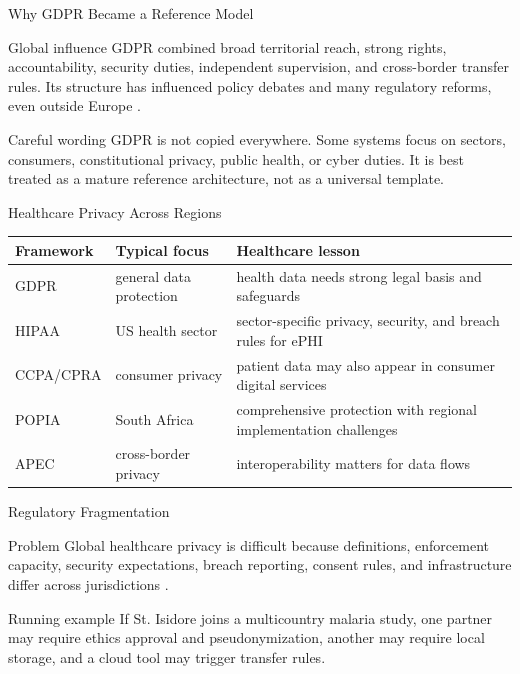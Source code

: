 \documentclass[presentation]{beamer}
\begin{document}
\begin{frame}[c]{Why GDPR Became a Reference Model}
\begin{block}{Global influence}
GDPR combined broad territorial reach, strong rights, accountability, security duties, independent
supervision, and cross-border transfer rules. Its structure has influenced policy debates and many
regulatory reforms, even outside Europe \cite{eurlex_gdpr,eu_framework}.
\end{block}

\begin{exampleblock}{Careful wording}
GDPR is not copied everywhere. Some systems focus on sectors, consumers, constitutional privacy,
public health, or cyber duties. It is best treated as a mature reference architecture, not as a
universal template.
\end{exampleblock}
\end{frame}

\begin{frame}[c]{Healthcare Privacy Across Regions}
\small
\begin{tabularx}{\textwidth}{@{}p{}p{}X@{}}
\toprule
\textbf{Framework} & \textbf{Typical focus} & \textbf{Healthcare lesson} \\
\midrule
GDPR & general data protection & health data needs strong legal basis and safeguards \\
HIPAA & US health sector & sector-specific privacy, security, and breach rules for ePHI \\
CCPA/CPRA & consumer privacy & patient data may also appear in consumer digital services \\
POPIA & South Africa & comprehensive protection with regional implementation challenges \\
APEC & cross-border privacy & interoperability matters for data flows \\
\bottomrule
\end{tabularx}
\end{frame}

\begin{frame}[c]{Regulatory Fragmentation}
\begin{block}{Problem}
Global healthcare privacy is difficult because definitions, enforcement capacity, security
expectations, breach reporting, consent rules, and infrastructure differ across jurisdictions
\cite{conduah2025}.
\end{block}

\begin{exampleblock}{Running example}
If St. Isidore joins a multicountry malaria study, one partner may require ethics approval and
pseudonymization, another may require local storage, and a cloud tool may trigger transfer rules.
\end{exampleblock}
\end{frame}
\end{document}
